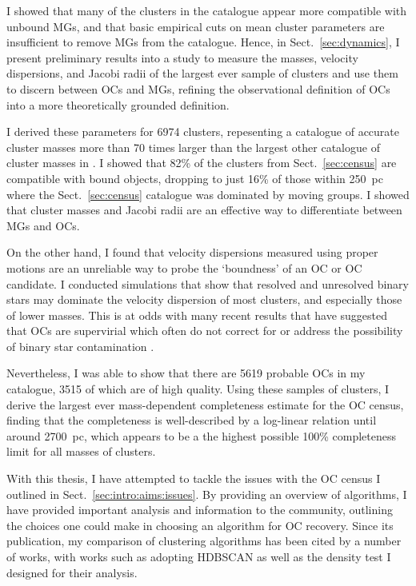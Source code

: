 I showed that many of the clusters in the catalogue appear more compatible with unbound MGs, and that basic empirical cuts on mean cluster parameters are insufficient to remove MGs from the catalogue. Hence, in Sect.~\ref{sec:dynamics}, I present preliminary results into a study to measure the masses, velocity dispersions, and Jacobi radii of the largest ever sample of clusters and use them to discern between OCs and MGs, refining the observational definition of OCs into a more theoretically grounded definition.

I derived these parameters for 6974 clusters, repesenting a catalogue of accurate cluster masses more than 70 times larger than the largest other catalogue of cluster masses in \gaia. I showed that 82\% of the clusters from Sect.~\ref{sec:census} are compatible with bound objects, dropping to just 16\% of those within 250~pc where the Sect.~\ref{sec:census} catalogue was dominated by moving groups. I showed that cluster masses and Jacobi radii are an effective way to differentiate between MGs and OCs.

On the other hand, I found that velocity dispersions measured using proper motions are an unreliable way to probe the `boundness' of an OC or OC candidate. I conducted simulations that show that resolved and unresolved binary stars may dominate the velocity dispersion of most clusters, and especially those of lower masses. This is at odds with many recent results that have suggested that OCs are supervirial which often do not correct for or address the possibility of binary star contamination \citep[e.g.][]{bravi_gaia-eso_2018,kuhn_kinematics_2019,pang_3d_2021}.

Nevertheless, I was able to show that there are 5619 probable OCs in my catalogue, 3515 of which are of high quality. Using these samples of clusters, I derive the largest ever mass-dependent completeness estimate for the OC census, finding that the completeness is well-described by a log-linear relation until around 2700~pc, which appears to be a the highest possible 100\% completeness limit for all masses of clusters.

With this thesis, I have attempted to tackle the issues with the OC census I outlined in Sect.~\ref{sec:intro:aims:issues}. By providing an overview of algorithms, I have provided important analysis and information to the community, outlining the choices one could make in choosing an algorithm for OC recovery. Since its publication, my comparison of clustering algorithms has been cited by a number of works, with works such as \cite{dellacroce_ongoing_hierarchical_2023a} adopting HDBSCAN as well as the density test I designed for their analysis. 

